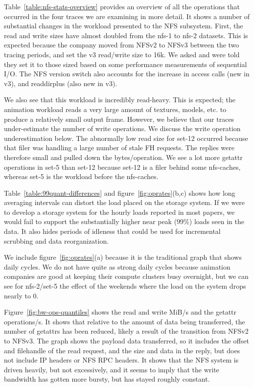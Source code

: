 Table~\ref{table:nfs-stats-overview} provides an overview of all the
operations that occurred in the four traces we are examining in more
detail.  It shows a number of substantial changes in the workload
presented to the NFS subsystem.  First, the read and write sizes have
almost doubled from the nfs-1 to nfs-2 datasets.  This is expected
because the company moved from NFSv2 to NFSv3 between the two
tracing periods, and set the v3 read/write size to 16k.  We asked and
were told they set it to those sized based on some performance
measurements of sequential I/O.  The NFS version switch also accounts
for the increase in access calls (new in v3), and readdirplus (also
new in v3).  

We also see that this workload is incredibly read-heavy.  This is
expected; the animation workload reads a very large amount of
textures, models, etc. to produce a relatively small output frame.
However, we believe that our traces under-estimate the number of write
operations.  We discuss the write operation underestimation below.
The abnormally low read size for set-12 occurred because
that filer was handling a large number of stale FH requests.  The
replies were therefore small and pulled down the bytes/operation.  We
see a lot more getattr operations in set-5 than set-12 because set-12
is a filer behind some nfs-caches, whereas set-5 is the workload
before the nfs-caches.

Table~\ref{table:99quant-differences} and
figure~\ref{fig:oprates}(b,c) shows how long averaging intervals
can distort the load placed on the storage system.  If we were to
develop a storage system for the hourly loads reported in most papers,
we would fail to support the substantially higher near peak (99\%)
loads seen in the data.  It also hides periods of idleness
that could be used for incremental scrubbing and data reorganization.

We include figure~\ref{fig:oprates}(a) because it is the traditional
graph that shows daily cycles.  We do not have quite as strong daily
cycles because animation companies are good at keeping their compute
clusters busy overnight, but we can see for nfs-2/set-5 the effect of
the weekends where the load on the system drops nearly to 0.

Figure~\ref{fig:bw-ops-quantiles} shows the read and write MiB/s and the
getattr operations/s.  It shows that relative to the amount of data
being transferred, the number of getattrs has been reduced, likely a
result of the transition from NFSv2 to NFSv3.  The graph shows the
payload data transferred, so it includes the offset and filehandle of
the read request, and the size and data in the reply, but does not
include IP headers or NFS RPC headers.  It shows that the NFS system
is driven heavily, but not excessively, and it seems to imply that the
write bandwidth has gotten more bursty, but has stayed roughly
constant.  

